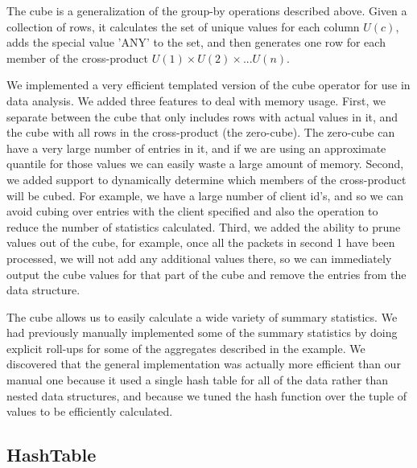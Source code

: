 The cube\cite{gray97cube} is a generalization of the group-by
operations described above.  Given a collection of rows, it calculates
the set of unique values for each column $U(c)$, adds the special
value 'ANY' to the set, and then generates one row for each member of
the cross-product $U(1) \times U(2) \times ... U(n)$.

We implemented a very efficient templated version of the cube operator
for use in data analysis.  We added three features to deal with memory
usage.  First, we separate between the cube that only includes rows
with actual values in it, and the cube with all rows in the
cross-product (the zero-cube).  The zero-cube can have a very large
number of entries in it, and if we are using an approximate quantile
for those values we can easily waste a large amount of memory.
Second, we added support to dynamically determine which members of the
cross-product will be cubed.  For example, we have a large number of
client id's, and so we can avoid cubing over entries with the client
specified and also the operation to reduce the number of statistics
calculated.  Third, we added the ability to prune values out of the
cube, for example, once all the packets in second 1 have been
processed, we will not add any additional values there, so we can
immediately output the cube values for that part of the cube and
remove the entries from the data structure.

The cube allows us to easily calculate a wide variety of summary
statistics.  We had previously manually implemented some of the
summary statistics by doing explicit roll-ups for some of the
aggregates described in the example.  We discovered that the general
implementation was actually more efficient than our manual one because
it used a single hash table for all of the data rather than nested
data structures, and because we tuned the hash function over the tuple
of values to be efficiently calculated.

\subsection{HashTable}

